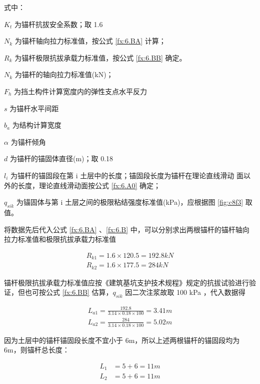 式中： 

$K_t$ 为锚杆抗拔安全系数；取 1.6

$N_k$ 为锚杆轴向拉力标准值，按公式 \ref{fx:6.BA} 计算；

$R_k$ 为锚杆极限抗拔承载力标准值，按公式 \ref{fx:6.BB} 确定。

$N_k$ 为锚杆的轴向拉力标准值(kN)；

$F_h$ 为挡土构件计算宽度内的弹性支点水平反力

$s$ 为锚杆水平间距

$b_a$ 为结构计算宽度

$\alpha$ 为锚杆倾角

$d$ 为锚杆的锚固体直径(m)；取 0.18

$l_i$ 为锚杆的锚固段在第 i 土层中的长度；锚固段长度为锚杆在理论直线滑动
面以外的长度，理论直线滑动面按公式 \ref{fx:6.A0} 确定；

$q_{sik}$ 为锚固体与第 i 土层之间的极限粘结强度标准值(kPa)，应根据图 \ref{fig:c8f3} 取值。

将数据先后代入公式 \ref{fx:6.BA} 、\ref{fx:6.B} 中，可以分别求出两根锚杆的锚杆轴向拉力标准值和极限抗拔承载力标准值

\begin{align*}
    R_{k1}=1.6×120.5=192.8kN\\
    R_{k2}=1.6×177.5=284kN
\end{align*}

锚杆极限抗拔承载力标准值应按《建筑基坑支护技术规程》规定的抗拔试验进行验证，但也可按公式 \ref{fx:6.BB} 估算，$q_{sik}$ 因二次注浆故取 100 kPa ，代入数据得

\begin{align*}
    L_{a1}=\frac{192.8}{3.14\times 0.18\times 100}=3.41 m\\
    L_{a2}=\frac{284}{3.14\times 0.18\times 100}=5.02 m
\end{align*}

因为土层中的锚杆锚固段长度不宜小于 6m，所以上述两根锚杆的锚固段均为 6m，则锚杆总长度：

\begin{align*}
L_1&=5+6=11m\\
L_2&=5+6=11m
\end{align*}

